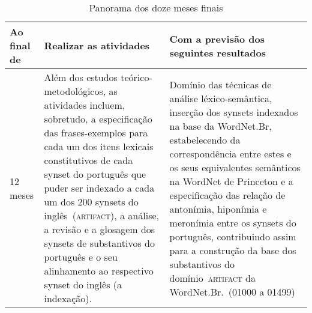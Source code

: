 \begin{table}[!h]\footnotesize
  \centering
  \begin{tabularx}{\linewidth}{ l X X } 
    \toprule
    \textbf{Ao final de} & \textbf{Realizar as atividades} & \textbf{Com a previsão dos seguintes resultados} \\
    \midrule
    12 meses & Além dos estudos teórico-metodológicos, as atividades incluem,
sobretudo, a especificação das frases-exemplos para cada um dos itens lexicais
constitutivos de cada synset do português que puder ser indexado a cada um dos
200 synsets do inglês~(\textsc{artifact}), a análise, a revisão e a glosagem
dos synsets de substantivos do português e o seu alinhamento ao respectivo
synset do inglês (a indexação). & Domínio das técnicas de análise
léxico-semântica, inserção dos synsets indexados na base da WordNet.Br,
estabelecendo da correspondência entre estes e os seus equivalentes semânticos
na WordNet de Princeton e a especificação das relação de antonímia, hiponímia e
meronímia entre os synsets do português, contribuindo assim para a construção
da base dos substantivos do domínio~\textsc{artifact} da WordNet.Br.~(01000 a
01499) \\
    \bottomrule
  \end{tabularx}
  \caption{Panorama dos doze meses finais}
  \label{panorama1}
\end{table}

